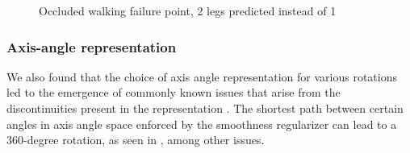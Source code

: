 \begin{figure}[!ht]
    \centering
    \hfil
    \hfil
    \caption{Occluded walking failure point, 2 legs predicted instead of 1}
    \label{fig:humor_bad_occluded_walking}
\end{figure}

\subsubsection{Axis-angle representation}
We also found that the choice of axis angle representation for various rotations led to the emergence of commonly known issues that arise from the discontinuities present in the representation \cite{aa_6d_angles}. The shortest path between certain angles in axis angle space enforced by the smoothness regularizer can lead to a 360-degree rotation, as seen in , among other issues.

